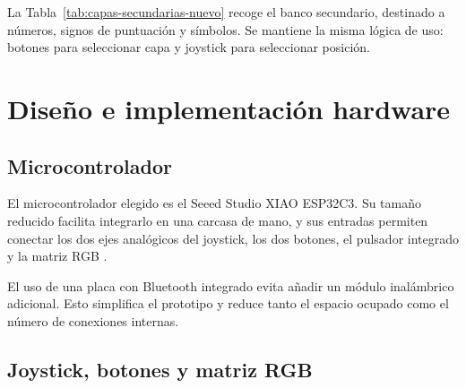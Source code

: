 La Tabla~\ref{tab:capas-secundarias-nuevo} recoge el banco secundario, destinado a números, signos de puntuación y símbolos. Se mantiene la misma lógica de uso: botones para seleccionar capa y joystick para seleccionar posición.

\begin{table}[H]
    \centering
    \caption{Distribución del banco secundario de números y símbolos}
    \label{tab:capas-secundarias-nuevo}
\end{table}

\section{Diseño e implementación hardware}
\label{sec:hardware-nuevo}

\subsection{Microcontrolador}
\label{subsec:microcontrolador-nuevo}

El microcontrolador elegido es el Seeed Studio XIAO ESP32C3. Su tamaño reducido facilita integrarlo en una carcasa de mano, y sus entradas permiten conectar los dos ejes analógicos del joystick, los dos botones, el pulsador integrado y la matriz RGB \cite{xiaoESP32C3}.

El uso de una placa con Bluetooth integrado evita añadir un módulo inalámbrico adicional. Esto simplifica el prototipo y reduce tanto el espacio ocupado como el número de conexiones internas.

\subsection{Joystick, botones y matriz RGB}
\label{subsec:joystick-botones-matriz-nuevo}

